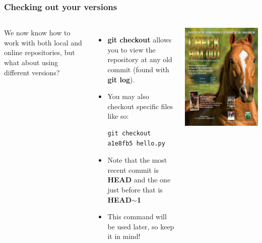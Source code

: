 \documentclass{beamer}
\begin{document}
\begin{frame}[fragile]
\frametitle{Checking out your versions}
\begin{columns}
We now know how to work with both local and online repositories, but what about using different versions?
\begin{itemize}
\item \textbf{git checkout} allows you to view the repository at any old commit (found with \textbf{git log}).
\item You may also checkout specific files like so:
        \begin{lstlisting}
git checkout a1e8fb5 hello.py
        \end{lstlisting}
\item Note that the most recent commit is \textbf{HEAD} and the one just before that is \textbf{HEAD$\mathbf{\sim}$1}
\item This command will be used later, so keep it in mind! 
\end{itemize}
\includegraphics[width=\textwidth]{check_him_out.jpg}
\end{columns}
\end{frame}
\end{document}
